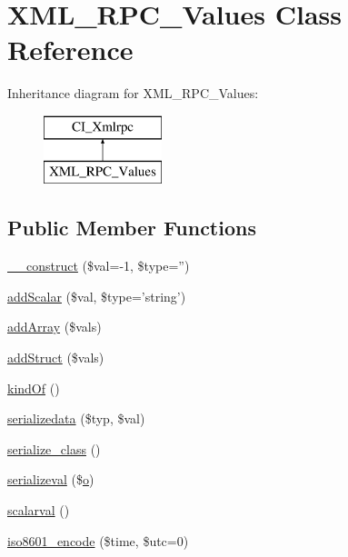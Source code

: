 \hypertarget{class_x_m_l___r_p_c___values}{\section{X\-M\-L\-\_\-\-R\-P\-C\-\_\-\-Values Class Reference}
\label{class_x_m_l___r_p_c___values}
}
Inheritance diagram for X\-M\-L\-\_\-\-R\-P\-C\-\_\-\-Values\-:\begin{figure}[H]
\begin{center}
\leavevmode
\includegraphics[height=2.000000cm]{class_x_m_l___r_p_c___values}
\end{center}
\end{figure}
\subsection*{Public Member Functions}
\begin{DoxyCompactItemize}
\item 
\hyperlink{class_x_m_l___r_p_c___values_af3d459d43acf9109a9604d02b12ccf44}{\-\_\-\-\_\-construct} (\$val=-\/1, \$type='')
\item 
\hyperlink{class_x_m_l___r_p_c___values_ac847166eee63ab7bfaa8b0e22ae19430}{add\-Scalar} (\$val, \$type='string')
\item 
\hyperlink{class_x_m_l___r_p_c___values_a2081e6a72b7e1c15f8c1dbcdfa673d4c}{add\-Array} (\$vals)
\item 
\hyperlink{class_x_m_l___r_p_c___values_a5dbdf0121566791a201cd07a3de15531}{add\-Struct} (\$vals)
\item 
\hyperlink{class_x_m_l___r_p_c___values_a3b169c364729cee2afdccadef5229f80}{kind\-Of} ()
\item 
\hyperlink{class_x_m_l___r_p_c___values_a7058e00e310218c447d3c9fea0ee0a3d}{serializedata} (\$typ, \$val)
\item 
\hyperlink{class_x_m_l___r_p_c___values_a59df3d3c8fbb47a946d6a29f0b3c8e0c}{serialize\-\_\-class} ()
\item 
\hyperlink{class_x_m_l___r_p_c___values_a1a4bfc79985c185745d96ebe3a1e5c3d}{serializeval} (\$\hyperlink{mathquill_8js_a33700a0631cf1313ca3994852b7ac399}{o})
\item 
\hyperlink{class_x_m_l___r_p_c___values_ac9a3751dc2d5479f409d0a4683c37d26}{scalarval} ()
\item 
\hyperlink{class_x_m_l___r_p_c___values_a7da53e4f2dcd98cc2024a938bcd79873}{iso8601\-\_\-encode} (\$time, \$utc=0)
\end{DoxyCompactItemize}
